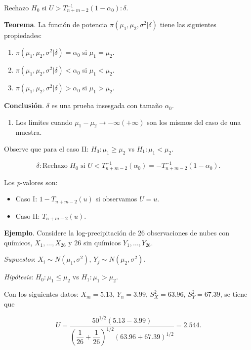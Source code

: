 \documentclass[
  12pt,
]{book}
\providecommand{\tightlist}{%
  \setlength{\itemsep}{0pt}\setlength{\parskip}{0pt}}
\begin{document}
Rechazo \(H_0\) si \(U> T_{n+m-2}^{-1}(1-\alpha_0): \delta\).

\textbf{Teorema}. La función de potencia \(\pi(\mu_1,\mu_2,\sigma^2|\delta)\) tiene las siguientes propiedades:

\begin{enumerate}
\def\labelenumi{\roman{enumi}.}
\item
  \(\pi(\mu_1,\mu_2,\sigma^2|\delta) = \alpha_0\) si \(\mu_1 = \mu_2\).
\item
  \(\pi(\mu_1,\mu_2,\sigma^2|\delta) < \alpha_0\) si \(\mu_1 < \mu_2\).
\item
  \(\pi(\mu_1,\mu_2,\sigma^2|\delta) > \alpha_0\) si \(\mu_1 > \mu_2\).
\end{enumerate}

\textbf{Conclusión}. \(\delta\) es una prueba insesgada con tamaño \(\alpha_0\).

\begin{enumerate}
\def\labelenumi{\roman{enumi}.}
\setcounter{enumi}{3}
\tightlist
\item
  Los límites cuando \(\mu_1-\mu_2\to -\infty (+\infty)\) son los mismos del caso de una muestra.
\end{enumerate}

Observe que para el caso II: \(H_0: \mu_1\geq\mu_2\) vs \(H_1: \mu_1<\mu_2\).

\[\delta: \text{Rechazo } H_0 \text{ si } U<T^{-1}_{n+m-2}(\alpha_0) = -T_{n+m-2}^{-1}(1-\alpha_0).\]

Los \emph{p}-valores son:

\begin{itemize}
\item
  Caso I: \(1-T_{n+m-2}(u)\) si observamos \(U = u\).
\item
  Caso II: \(T_{n+m-2}(u)\).
\end{itemize}

\textbf{Ejemplo}. Considere la log-precipitación de 26 observaciones de nubes con químicos, \(X_1,\dots,X_{26}\) y 26 sin químicos \(Y_1,\dots,Y_{26}\).

\emph{Supuestos}: \(X_i\sim N(\mu_1,\sigma^2)\), \(Y_j\sim N(\mu_2,\sigma^2)\).

\emph{Hipótesis}: \(H_0: \mu_1\leq\mu_2\) vs \(H_1: \mu_1>\mu_2\).

Con los siguientes datos: \(\bar X_m = 5.13\), \(\bar Y_n = 3.99\), \(S_X^2 = 63.96\), \(S_Y^2=67.39\), se tiene que

\[U = \dfrac{50^{1/2}(5.13-3.99)}{\left(\dfrac{1}{26}+\dfrac{1}{26}\right)^{1/2}(63.96+67.39)^{1/2}} = 2.544.\]
\end{document}

